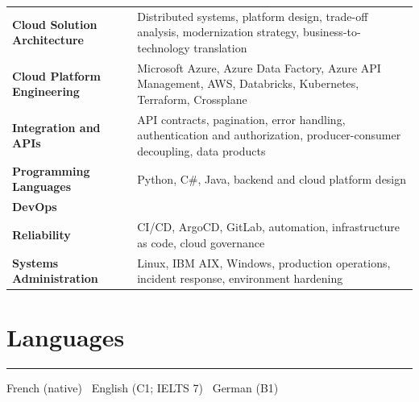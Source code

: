 \documentclass[10pt,a4paper]{article}
\newcommand{\sectionrule}{\noindent\rule{\linewidth}{0.4pt}\par\vspace{0.24em}}
\begin{document}
\begin{tabularx}{\textwidth}{@{}>{\bfseries}l X@{}}
Cloud Solution Architecture & Distributed systems, platform design, trade-off analysis, modernization strategy, business-to-technology translation \\
Cloud Platform Engineering & Microsoft Azure, Azure Data Factory, Azure API Management, AWS, Databricks, Kubernetes, Terraform, Crossplane \\
Integration and APIs & API contracts, pagination, error handling, authentication and authorization, producer-consumer decoupling, data products \\
Programming Languages & Python, C\#, Java, backend and cloud platform design \\
DevOps \\ Reliability & CI/CD, ArgoCD, GitLab, automation, infrastructure as code, cloud governance \\
Systems Administration & Linux, IBM AIX, Windows, production operations, incident response, environment hardening \\
\end{tabularx}

\section*{Languages}
\sectionrule
French (native) \textbullet\ English (C1; IELTS 7) \textbullet\ German (B1)
\end{document}
